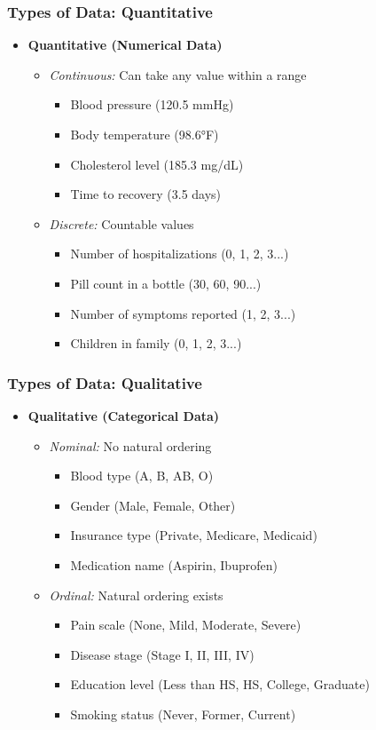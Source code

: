 \documentclass{beamer}
\begin{document}
\begin{frame}
\frametitle{Types of Data: Quantitative}
\large
\begin{itemize}
\item \textbf{Quantitative (Numerical Data)}
  \begin{itemize}
  \item \textit{Continuous:} Can take any value within a range
    \begin{itemize}
    \item Blood pressure (120.5 mmHg)
    \item Body temperature (98.6°F)
    \item Cholesterol level (185.3 mg/dL)
    \item Time to recovery (3.5 days)
    \end{itemize}
  \vspace{0.3cm}
  \item \textit{Discrete:} Countable values
    \begin{itemize}
    \item Number of hospitalizations (0, 1, 2, 3...)
    \item Pill count in a bottle (30, 60, 90...)
    \item Number of symptoms reported (1, 2, 3...)
    \item Children in family (0, 1, 2, 3...)
    \end{itemize}
  \end{itemize}
\end{itemize}
\end{frame}

\begin{frame}
\frametitle{Types of Data: Qualitative}
\large
\begin{itemize}
\item \textbf{Qualitative (Categorical Data)}
  \begin{itemize}
  \item \textit{Nominal:} No natural ordering
    \begin{itemize}
    \item Blood type (A, B, AB, O)
    \item Gender (Male, Female, Other)
    \item Insurance type (Private, Medicare, Medicaid)
    \item Medication name (Aspirin, Ibuprofen)
    \end{itemize}
  \vspace{0.3cm}
  \item \textit{Ordinal:} Natural ordering exists
    \begin{itemize}
    \item Pain scale (None, Mild, Moderate, Severe)
    \item Disease stage (Stage I, II, III, IV)
    \item Education level (Less than HS, HS, College, Graduate)
    \item Smoking status (Never, Former, Current)
    \end{itemize}
  \end{itemize}
\end{itemize}
\end{frame}
\end{document}
